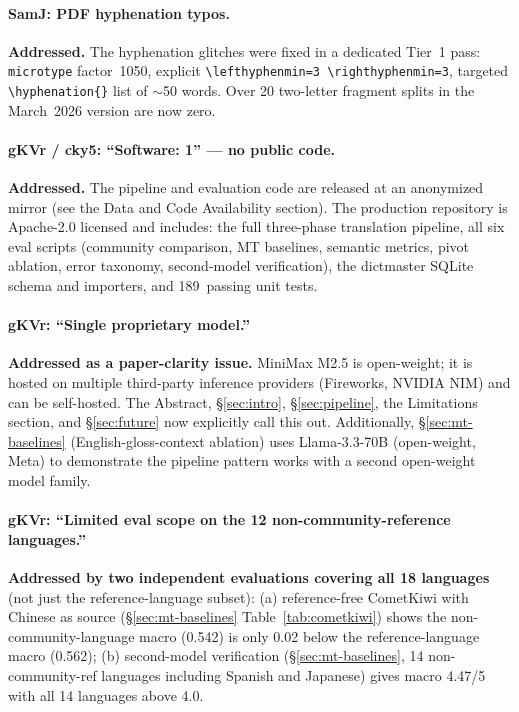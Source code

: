 \documentclass[11pt]{article}
\begin{document}
\paragraph{SamJ: PDF hyphenation typos.}

\textbf{Addressed.} The hyphenation glitches were fixed in a dedicated Tier~1 pass: \texttt{microtype} factor~1050, explicit \texttt{\textbackslash lefthyphenmin=3 \textbackslash righthyphenmin=3}, targeted \texttt{\textbackslash hyphenation\{\}} list of $\sim$50 words. Over 20 two-letter fragment splits in the March~2026 version are now zero.

\paragraph{gKVr / cky5: ``Software: 1'' --- no public code.}

\textbf{Addressed.} The pipeline and evaluation code are released at an anonymized mirror (see the Data and Code Availability section). The production repository is Apache-2.0 licensed and includes: the full three-phase translation pipeline, all six eval scripts (community comparison, MT baselines, semantic metrics, pivot ablation, error taxonomy, second-model verification), the dictmaster SQLite schema and importers, and 189~passing unit tests.

\paragraph{gKVr: ``Single proprietary model.''}

\textbf{Addressed as a paper-clarity issue.} MiniMax M2.5 is open-weight; it is hosted on multiple third-party inference providers (Fireworks, NVIDIA NIM) and can be self-hosted. The Abstract, \S\ref{sec:intro}, \S\ref{sec:pipeline}, the Limitations section, and \S\ref{sec:future} now explicitly call this out. Additionally, \S\ref{sec:mt-baselines} (English-gloss-context ablation) uses Llama-3.3-70B (open-weight, Meta) to demonstrate the pipeline pattern works with a second open-weight model family.

\paragraph{gKVr: ``Limited eval scope on the 12 non-community-reference languages.''}

\textbf{Addressed by two independent evaluations covering all 18 languages} (not just the reference-language subset): (a) reference-free CometKiwi with Chinese as source (\S\ref{sec:mt-baselines} Table~\ref{tab:cometkiwi}) shows the non-community-language macro (0.542) is only 0.02 below the reference-language macro (0.562); (b) second-model verification (\S\ref{sec:mt-baselines}, 14 non-community-ref languages including Spanish and Japanese) gives macro 4.47/5 with all 14 languages above 4.0.
\end{document}
